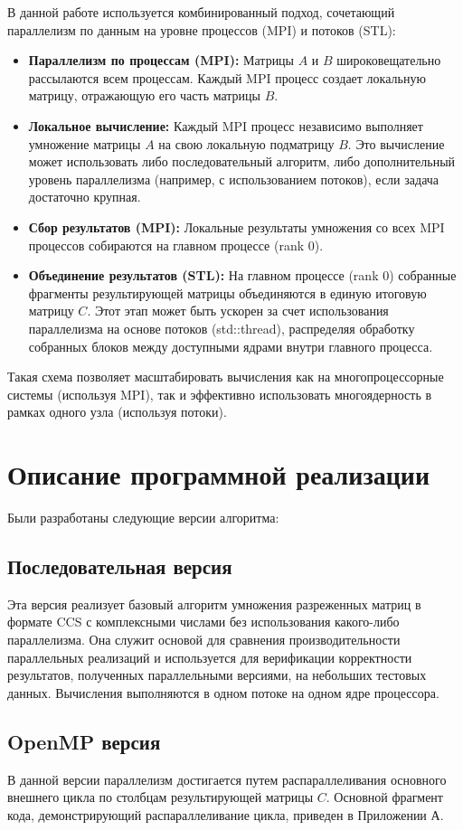\documentclass[12pt]{article}
\begin{document}
В данной работе используется комбинированный подход, сочетающий параллелизм по данным на уровне процессов (MPI) и потоков (STL):
\begin{itemize}
    \item \textbf{Параллелизм по процессам (MPI):} Матрицы $A$ и $B$ широковещательно рассылаются всем процессам. Каждый MPI процесс создает локальную матрицу, отражающую его часть матрицы $B$.
    \item \textbf{Локальное вычисление:} Каждый MPI процесс независимо выполняет умножение матрицы $A$ на свою локальную подматрицу $B$. Это вычисление может использовать либо последовательный алгоритм, либо дополнительный уровень параллелизма (например, с использованием потоков), если задача достаточно крупная.
    \item \textbf{Сбор результатов (MPI):} Локальные результаты умножения со всех MPI процессов собираются на главном процессе (rank 0).
    \item \textbf{Объединение результатов (STL):} На главном процессе (rank 0) собранные фрагменты результирующей матрицы объединяются в единую итоговую матрицу $C$. Этот этап может быть ускорен за счет использования параллелизма на основе потоков (std::thread), распределяя обработку собранных блоков между доступными ядрами внутри главного процесса.
\end{itemize}
Такая схема позволяет масштабировать вычисления как на многопроцессорные системы (используя MPI), так и эффективно использовать многоядерность в рамках одного узла (используя потоки).
\newpage

\section{Описание программной реализации}
Были разработаны следующие версии алгоритма:

\subsection{Последовательная версия}
Эта версия реализует базовый алгоритм умножения разреженных матриц в формате CCS с комплексными числами без использования какого-либо параллелизма. Она служит основой для сравнения производительности параллельных реализаций и используется для верификации корректности результатов, полученных параллельными версиями, на небольших тестовых данных. Вычисления выполняются в одном потоке на одном ядре процессора.

\subsection{OpenMP версия}
В данной версии параллелизм достигается путем распараллеливания основного внешнего цикла по столбцам результирующей матрицы $C$. Основной фрагмент кода, демонстрирующий распараллеливание цикла, приведен в Приложении А.
\end{document}
